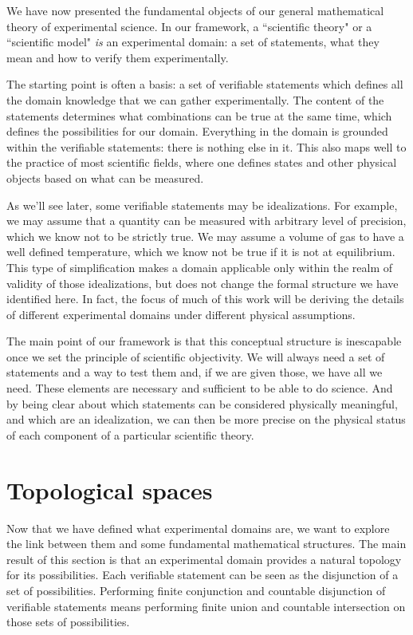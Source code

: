 \documentclass[11pt,letterpaper,fleqn]{memoir} %
\begin{document}
We have now presented the fundamental objects of our general mathematical theory of experimental science. In our framework, a ``scientific theory" or a ``scientific model" \emph{is} an experimental domain: a set of statements, what they mean and how to verify them experimentally.

The starting point is often a basis: a set of verifiable statements which defines all the domain knowledge that we can gather experimentally. The content of the statements determines what combinations can be true at the same time, which defines the possibilities for our domain. Everything in the domain is grounded within the verifiable statements: there is nothing else in it. This also maps well to the practice of most scientific fields, where one defines states and other physical objects based on what can be measured.

As we'll see later, some verifiable statements may be idealizations. For example, we may assume that a quantity can be measured with arbitrary level of precision, which we know not to be strictly true. We may assume a volume of gas to have a well defined temperature, which we know not be true if it is not at equilibrium. This type of simplification makes a domain applicable only within the realm of validity of those idealizations, but does not change the formal structure we have identified here. In fact, the focus of much of this work will be deriving the details of different experimental domains under different physical assumptions.

The main point of our framework is that this conceptual structure is inescapable once we set the principle of scientific objectivity. We will always need a set of statements and a way to test them and, if we are given those, we have all we need. These elements are necessary and sufficient to be able to do science. And by being clear about which statements can be considered physically meaningful, and which are an idealization, we can then be more precise on the physical status of each component of a particular scientific theory.

\section{Topological spaces}

Now that we have defined what experimental domains are, we want to explore the link between them and some fundamental mathematical structures. The main result of this section is that an experimental domain provides a natural topology for its possibilities. Each verifiable statement can be seen as the disjunction of a set of possibilities. Performing finite conjunction and countable disjunction of verifiable statements means performing finite union and countable intersection on those sets of possibilities.
\end{document}
